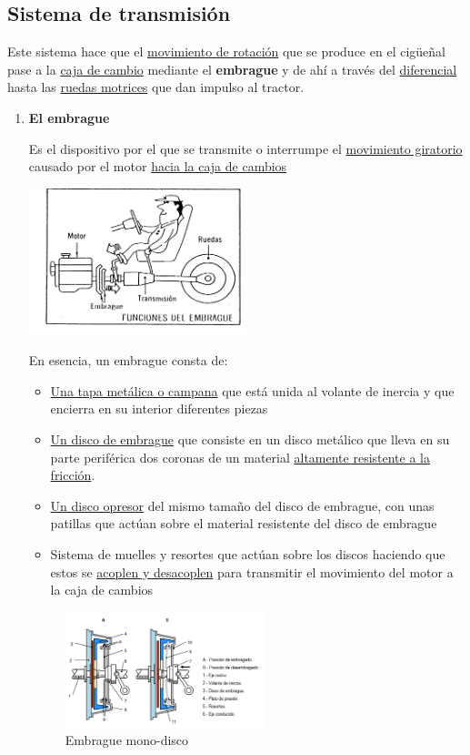 \documentclass[a4paper,12pt,oneside]{book}
\begin{document}
\subsection{Sistema de transmisión}
\label{sec:orge526b2e}
Este sistema hace que el \uline{movimiento de rotación} que se produce en el cigüeñal
pase a la \uline{caja de cambio} mediante el \textbf{embrague} y de ahí a través del
\uline{diferencial} hasta las \uline{ruedas motrices} que dan impulso al tractor.
\begin{enumerate}
\item \textbf{El embrague}
\label{sec:org436f56f}

Es el dispositivo por el que se transmite o interrumpe el \uline{movimiento
giratorio} causado por el motor \uline{hacia la caja de cambios}
\begin{center}
\includegraphics[width=0.5\textwidth]{./img_0009/embrague_1.png}
\end{center}
En esencia, un embrague consta de:
\begin{itemize}
\item \uline{Una tapa metálica o campana} que está unida al volante de inercia y que
encierra en su interior diferentes piezas
\item \uline{Un disco de embrague} que consiste en un disco metálico que lleva en su
parte periférica dos coronas de un material \uline{altamente resistente a la fricción}.
\item \uline{Un disco opresor} del mismo tamaño del disco de embrague, con unas patillas
que actúan sobre el material resistente del disco de embrague
\item Sistema de muelles y resortes que actúan sobre los discos haciendo que estos se
\uline{acoplen y desacoplen} para transmitir el movimiento del motor a la caja de
cambios
\end{itemize}

\begin{figure}[htbp]
\centering
\includegraphics[width=0.55\textwidth]{./img_0009/embrague.png}
\caption{Embrague mono-disco}
\end{figure}


\end{enumerate}
\end{document}
